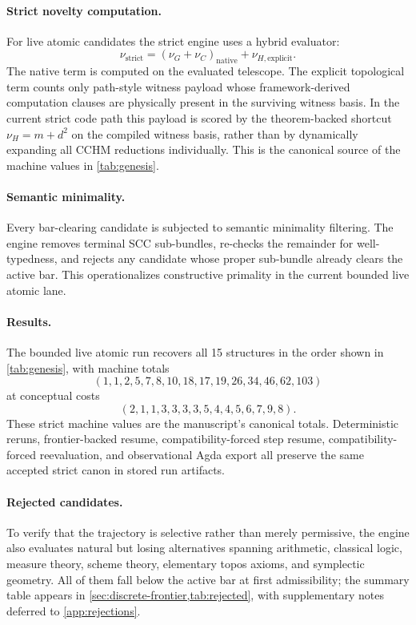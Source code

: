 \documentclass[11pt,a4paper]{article}
\theoremstyle{plain}
\theoremstyle{definition}
\theoremstyle{remark}
\begin{document}
\paragraph{Strict novelty computation.}
For live atomic candidates the strict engine uses a hybrid evaluator:
\[
  \nu_{\mathrm{strict}} = (\nu_G+\nu_C)_{\mathrm{native}} + \nu_{H,\mathrm{explicit}}.
\]
The native term is computed on the evaluated telescope.
The explicit topological term counts only path-style witness payload whose framework-derived computation clauses are physically present in the surviving witness basis.
In the current strict code path this payload is scored by the theorem-backed shortcut $\nu_H=m+d^2$ on the compiled witness basis, rather than by dynamically expanding all CCHM reductions individually.
This is the canonical source of the machine values in \cref{tab:genesis}.

\paragraph{Semantic minimality.}
Every bar-clearing candidate is subjected to semantic minimality filtering.
The engine removes terminal SCC sub-bundles, re-checks the remainder for well-typedness, and rejects any candidate whose proper sub-bundle already clears the active bar.
This operationalizes constructive primality in the current bounded live atomic lane.

\paragraph{Results.}
The bounded live atomic run recovers all 15 structures in the order shown in \cref{tab:genesis}, with machine totals
\[
  (1,1,2,5,7,8,10,18,17,19,26,34,46,62,103)
\]
at conceptual costs
\[
  (2,1,1,3,3,3,3,5,4,4,5,6,7,9,8).
\]
These strict machine values are the manuscript's canonical totals.
Deterministic reruns, frontier-backed resume, compatibility-forced step resume, compatibility-forced reevaluation, and observational Agda export all preserve the same accepted strict canon in stored run artifacts.

\paragraph{Rejected candidates.}
To verify that the trajectory is selective rather than merely permissive, the engine also evaluates natural but losing alternatives spanning arithmetic, classical logic, measure theory, scheme theory, elementary topos axioms, and symplectic geometry.
All of them fall below the active bar at first admissibility; the summary table appears in \cref{sec:discrete-frontier,tab:rejected}, with supplementary notes deferred to \cref{app:rejections}.
\end{document}
